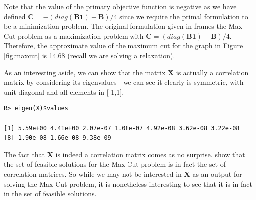 \documentclass{article}
\newcommand{\ve}[1]{\mathbf{#1}}           %
\newcommand{\m}[1]{\mathbf{#1}}               %
\begin{document}
Note that the value of the primary objective function is negative as we have defined $\m{C} = -(diag(\m{B}\ve{1}) - \m{B})/4$ since we require the primal formulation to be a minimization problem. The original formulation given in \cite{goemans1995improved} frames the Max-Cut problem as a maximization problem with $\m{C} = (diag(\m{B}\ve{1}) - \m{B})/4$. Therefore, the approximate value of the maximum cut for the graph in Figure \ref{fig:maxcut} is 14.68 (recall we are solving a relaxation). 

As an interesting aside, we can show that the matrix $\m{X}$ is actually a correlation matrix by considering its eigenvalues - we can see it clearly is symmetric, with unit diagonal and all elements in [-1,1].

\begin{verbatim}
R> eigen(X)$values

[1] 5.59e+00 4.41e+00 2.07e-07 1.08e-07 4.92e-08 3.62e-08 3.22e-08
[8] 1.90e-08 1.66e-08 9.38e-09
\end{verbatim}

The fact that $\m{X}$ is indeed a correlation matrix comes as no surprise. \cite{goemans1995improved} show that the set of feasible solutions for the Max-Cut problem is in fact the set of correlation matrices. So while we may not be interested in $\m{X}$ as an output for solving the Max-Cut problem, it is nonetheless interesting to see that it is in fact in the set of feasible solutions.



\end{document}
